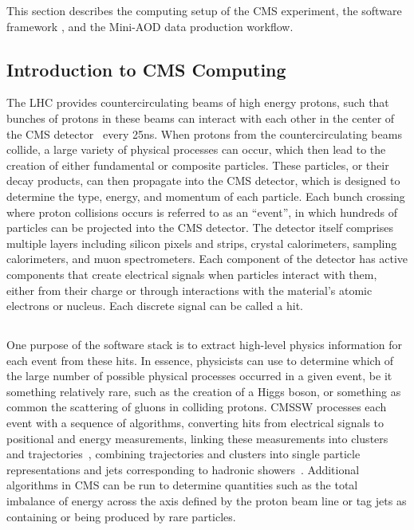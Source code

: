 This section describes the computing setup of the CMS experiment, the software framework \CMSSW, and the Mini-AOD data production workflow.

\subsection{Introduction to CMS Computing}
\label{sec:implementation}

The LHC provides countercirculating beams of high energy protons, such that bunches of protons in these beams can interact with each other in the center of the CMS detector~\cite{CMS:2008xjf} every 25\unit{ns}. When protons from the countercirculating beams collide, a large variety of physical processes can occur, which then lead to the creation of either fundamental or composite particles. These particles, or their decay products, can then propagate into the CMS detector, which is designed to determine the type, energy, and momentum of each particle. Each bunch crossing where proton collisions occurs is referred to as an ``event'', in which hundreds of particles can be projected into the CMS detector. The detector itself comprises multiple layers including silicon pixels and strips, crystal calorimeters, sampling calorimeters, and muon spectrometers. Each component of the detector has active components that create electrical signals when particles interact with them, either from their charge or through interactions with the material's atomic electrons or nucleus. Each discrete signal can be called a hit.

\subsection{\CMSSW}
\label{sec:cmssw}
One purpose of the \CMSSW software stack is to extract high-level physics information for each event from these hits. In essence, physicists can use \CMSSW to determine which of the large number of possible physical processes occurred in a given event, be it something relatively rare, such as the creation of a Higgs boson, or something as common the scattering of gluons in colliding protons. CMSSW processes each event with a sequence of algorithms, converting hits from electrical signals to positional and energy measurements, linking these measurements into clusters~\cite{CMS:2020uim} and trajectories~\cite{CMS:2014pgm}, combining trajectories and clusters into single particle representations and jets corresponding to hadronic showers~\cite{CMS:2017yfk}. Additional algorithms in CMS can be run to determine quantities such as the total imbalance of energy across the axis defined by the proton beam line or tag jets as containing or being produced by rare particles.

